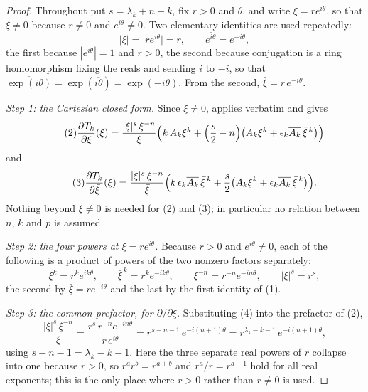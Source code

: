 \begin{proof}
Throughout put $s=\lambda_k+n-k$, fix $r>0$ and $\theta$, and write
$\xi=re^{i\theta}$, so that $\xi\ne0$ because $r\ne0$ and $e^{i\theta}\ne0$.
Two elementary identities are used repeatedly:
\begin{equation}\tag{1}
  |\xi|=\bigl|re^{i\theta}\bigr|=r,
  \qquad
  \overline{e^{i\theta}}=e^{-i\theta},
\end{equation}
the first because $|e^{i\theta}|=1$ and $r>0$, the second because conjugation
is a ring homomorphism fixing the reals and sending $i$ to $-i$, so that
$\overline{\exp(i\theta)}=\exp(\overline{i\theta})=\exp(-i\theta)$.  From the
second, $\bar\xi=r\,e^{-i\theta}$.

\emph{Step 1: the Cartesian closed form.}  Since $\xi\ne0$,
 applies verbatim and gives
\begin{equation}\tag{2}
  \frac{\partial T_k}{\partial\xi}(\xi)
  =\frac{|\xi|^{s}\,\xi^{-n}}{\xi}
    \Bigl(k\,A_k\xi^{k}
      +\Bigl(\frac{s}{2}-n\Bigr)
        \bigl(A_k\xi^{k}+\epsilon_k\overline{A_k}\,\bar\xi^{\,k}\bigr)\Bigr)
\end{equation}
and
\begin{equation}\tag{3}
  \frac{\partial T_k}{\partial\bar\xi}(\xi)
  =\frac{|\xi|^{s}\,\xi^{-n}}{\bar\xi}
    \Bigl(k\,\epsilon_k\overline{A_k}\,\bar\xi^{\,k}
      +\frac{s}{2}
        \bigl(A_k\xi^{k}+\epsilon_k\overline{A_k}\,\bar\xi^{\,k}\bigr)\Bigr).
\end{equation}
Nothing beyond $\xi\ne0$ is needed for (2) and (3); in particular no relation
between $n$, $k$ and $p$ is assumed.

\emph{Step 2: the four powers at $\xi=re^{i\theta}$.}  Because $r>0$ and
$e^{i\theta}\ne0$, each of the following is a product of powers of the two
nonzero factors separately:
\begin{equation}\tag{4}
  \xi^{k}=r^{k}e^{ik\theta},\qquad
  \bar\xi^{\,k}=r^{k}e^{-ik\theta},\qquad
  \xi^{-n}=r^{-n}e^{-in\theta},\qquad
  |\xi|^{s}=r^{s},
\end{equation}
the second by $\bar\xi=re^{-i\theta}$ and the last by the first identity of
(1).

\emph{Step 3: the common prefactor, for $\partial/\partial\xi$.}  Substituting
(4) into the prefactor of (2),
\[
  \frac{|\xi|^{s}\,\xi^{-n}}{\xi}
  =\frac{r^{s}\,r^{-n}e^{-in\theta}}{r\,e^{i\theta}}
  =r^{s-n-1}\,e^{-i(n+1)\theta}
  =r^{\lambda_k-k-1}\,e^{-i(n+1)\theta},
\]
using $s-n-1=\lambda_k-k-1$.  Here the three separate real powers of $r$
collapse into one because $r>0$, so $r^{a}r^{b}=r^{a+b}$ and $r^{a}/r=r^{a-1}$
hold for all real exponents; this is the only place where $r>0$ rather than
$r\ne0$ is used.


\end{proof}
